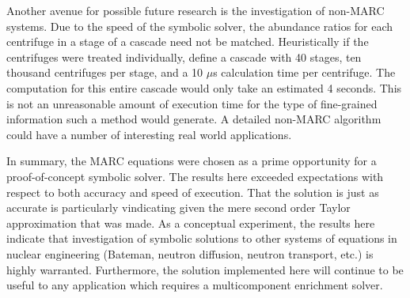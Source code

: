 \documentclass{ansconf}
\newcommand{\us}[0]{$\mu$s }
\begin{document}
Another avenue for possible future research is the investigation of non-MARC 
systems.  Due to the speed of the symbolic solver, the abundance ratios for 
each centrifuge in a stage of a cascade need not be matched.  Heuristically
if the centrifuges were treated individually, define a cascade with 40 stages, 
ten thousand centrifuges per stage, and a 10 \us calculation time per centrifuge. 
The computation for this entire
cascade would only take an estimated 4 seconds.  This is not an unreasonable 
amount of execution time for the type of fine-grained information such a 
method would generate.  A detailed non-MARC algorithm could have a number of
interesting real world applications.

In summary, the MARC equations were chosen as a prime opportunity for a 
proof-of-concept symbolic solver.  The results here exceeded expectations with 
respect to
both accuracy and speed of execution.  That the solution is just as accurate 
is particularly vindicating given the mere second order Taylor approximation that 
was made.  As a conceptual experiment, the results here indicate that
investigation of symbolic solutions to other systems of equations in 
nuclear engineering (Bateman, neutron diffusion, neutron transport, etc.) is
highly warranted.  Furthermore, the solution implemented here will continue to be 
useful to any application which requires a multicomponent enrichment solver.

\setlength{\baselineskip}{12pt}



\end{document}
